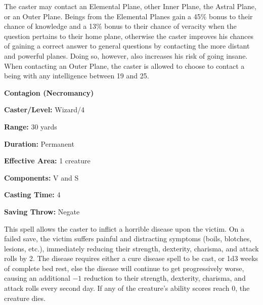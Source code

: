 \begin{multicols}{2}

The caster may contact an Elemental Plane, other Inner Plane, the Astral Plane, or an Outer Plane.  Beings from the Elemental Planes gain a 45\% bonus to their chance of knowledge and a 13\% bonus to their chance of veracity when the question pertains to their home plane, otherwise the caster improves his chances of gaining a correct answer to general questions by contacting the more distant and powerful planes.  Doing so, however, also increases his risk of going insane.  When contacting an Outer Plane, the caster is allowed to choose to contact a being with any intelligence between 19 and 25.



\vspace{1em}

\noindent
\begin{minipage}{\columnwidth}

\noindent \textbf{Contagion (Necromancy)}

\noindent \textbf{Caster/Level:} Wizard/4

\noindent \textbf{Range:} 30 yards

\noindent \textbf{Duration:} Permanent

\noindent \textbf{Effective Area:} 1 creature

\noindent \textbf{Components:} V and S

\noindent \textbf{Casting Time:} 4

\noindent \textbf{Saving Throw:} Negate

\end{minipage}

This spell allows the caster to inflict a horrible disease upon the victim.  On a failed save, the victim suffers painful and distracting symptoms (boils, blotches, lesions, etc.), immediately reducing their strength, dexterity, charisma, and attack rolls by 2.  The disease requires either a cure disease spell to be cast, or 1d3 weeks of complete bed rest, else the disease will continue to get progressively worse, causing an additional $-1$ reduction to their strength, dexterity, charisma, and attack rolls every second day.  If any of the creature's ability scores reach 0, the creature dies.  

\vspace{1em}

\noindent
\begin{minipage}{\columnwidth}


\end{minipage}
\end{multicols}
